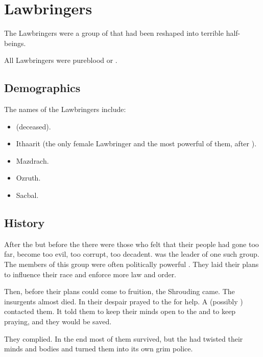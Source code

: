 \section{Lawbringers}
The Lawbringers were a group of \resphain that had been reshaped into terrible half-\resphan beings. 

All Lawbringers were pureblood \resphain or \resviel. 









\subsection{Demographics}
The names of the Lawbringers include:
\begin{itemize}
  \item \Dolsharra (deceased).
  \item Ithaarit (the only female Lawbringer and the most powerful of them, after \Dolsharra).
  \item Mazdrach.
  \item Ozruth.
  \item Sacbal. 
\end{itemize}










\subsection{History}
After the  but before the  there were those \resphain who felt that their people had gone too far, become too evil, too corrupt, too decadent. 
 was the leader of one such group. 
The members of this group were often politically powerful \resphain.
They laid their plans to influence their race and enforce more law and order. 

Then, before their plans could come to fruition, the Shrouding came. 
The insurgents almost died.
In their despair \Dolsharra prayed to the \SitraAchras for help. 
A \banelord (possibly \Daggerrain) contacted them. 
It told them to keep their minds open to the \SitraAchras and to keep praying, and they would be saved. 

They complied.
In the end most of them survived, but the \banelord had twisted their minds and bodies and turned them into its own grim police. 

